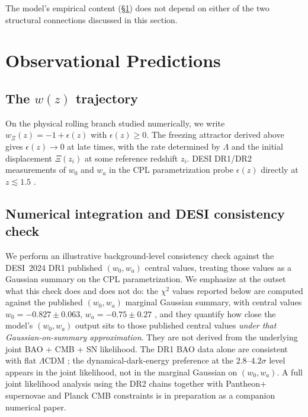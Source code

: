 \documentclass[11pt,reqno]{amsart}
\theoremstyle{plain}
\theoremstyle{definition}
\theoremstyle{remark}
\begin{document}
The model's empirical content (\S\ref{sec:obs}) does not depend on either
of the two structural connections discussed in this section.

\section{Observational Predictions}\label{sec:obs}

\subsection{The $w(z)$ trajectory}

On the physical rolling branch studied numerically, we write
$w_\Xi(z) = -1 + \epsilon(z)$ with $\epsilon(z) \geq 0$. The freezing
attractor derived above gives $\epsilon(z) \to 0$ at late times, with
the rate determined by $\Lambda$ and the initial displacement $\Xi(z_i)$
at some reference redshift $z_i$. DESI DR1/DR2 measurements of $w_0$
and $w_a$ in the CPL parametrization probe $\epsilon(z)$ directly at
$z \lesssim 1.5$ \cite{DESI2024BAO,DESI2024VI}.

\subsection{Numerical integration and DESI consistency check}\label{sec:desifit}

We perform an illustrative background-level consistency check against
the DESI~2024 DR1 published $(w_0, w_a)$ central values, treating those
values as a Gaussian summary on the CPL parametrization. We emphasize at
the outset what this check does and does not do: the
$\chi^{2}$ values reported below are computed against the published
$(w_0, w_a)$ marginal Gaussian summary, with central values
$w_0 = -0.827 \pm 0.063$, $w_a = -0.75 \pm 0.27$ \cite{DESI2024VI}, and
they quantify how close the model's $(w_0, w_a)$ output sits to those
published central values \emph{under that Gaussian-on-summary
approximation}. They are not derived from the underlying joint
BAO + CMB + SN likelihood. The DR1 BAO data alone are consistent with
flat $\Lambda$CDM \cite{DESI2024BAO}; the dynamical-dark-energy
preference at the $2.8$--$4.2\sigma$ level appears in the joint
likelihood, not in the marginal Gaussian on $(w_0, w_a)$. A full joint
likelihood analysis using the DR2 chains \cite{DESI2025DR2} together
with Pantheon+ supernovae and Planck CMB constraints is in preparation
as a companion numerical paper.
\end{document}
